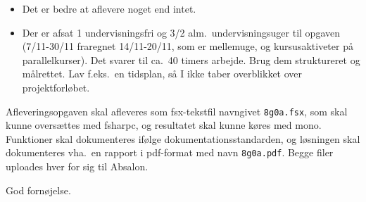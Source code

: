 \documentclass[a4paper,12pt]{article}
\begin{document}
\begin{enumerate}[label=8g.\arabic*,start=0]
\begin{itemize}
  \item Det er bedre at aflevere noget end intet.
  \item Der er afsat 1 undervisningsfri og 3/2 alm.\ undervisningsuger til opgaven (7/11-30/11 fraregnet 14/11-20/11, som er mellemuge, og kursusaktiveter på parallelkurser). Det svarer til ca.\ 40 timers arbejde. Brug dem struktureret og målrettet. Lav f.eks.\ en tidsplan, så I ikke taber overblikket over projektforløbet.
  \end{itemize}
\end{enumerate}
Afleveringsopgaven skal afleveres som fsx-tekstfil navngivet \lstinline!8g0a.fsx!, som skal kunne oversættes med fsharpc, og resultatet skal kunne køres med mono. Funktioner skal dokumenteres ifølge dokumentationsstandarden, og løsningen skal dokumenteres vha.\ en rapport i pdf-format med navn \lstinline!8g0a.pdf!. Begge filer uploades hver for sig til Absalon.

\flushright God fornøjelse.
\end{document}
